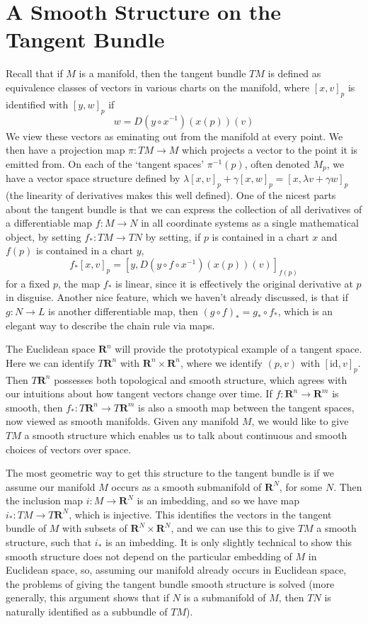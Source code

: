 \section{A Smooth Structure on the Tangent Bundle}

Recall that if $M$ is a manifold, then the tangent bundle $TM$ is defined as equivalence classes of vectors in various charts on the manifold, where $[x,v]_p$ is identified with $[y,w]_p$ if
%
\[ w = D(y \circ x^{-1})(x(p))(v) \]
%
We view these vectors as eminating out from the manifold at every point. We then have a projection map $\pi: TM \to M$ which projects a vector to the point it is emitted from. On each of the `tangent spaces' $\pi^{-1}(p)$, often denoted $M_p$, we have a vector space structure defined by $\lambda [x,v]_p + \gamma [x,w]_p = [x,\lambda v + \gamma w]_p$ (the linearity of derivatives makes this well defined). One of the nicest parts about the tangent bundle is that we can express the collection of all derivatives of a differentiable map $f: M \to N$ in all coordinate systems as a single mathematical object, by setting $f_*: TM \to TN$ by setting, if $p$ is contained in a chart $x$ and $f(p)$ is contained in a chart $y$,
%
\[ f_*[x,v]_p = \left[ y, D(y \circ f \circ x^{-1})(x(p))(v) \right]_{f(p)} \]
%
for a fixed $p$, the map $f_*$ is linear, since it is effectively the original derivative at $p$ in disguise. Another nice feature, which we haven't already discussed, is that if $g: N \to L$ is another differentiable map, then $(g \circ f)_* = g_* \circ f_*$, which is an elegant way to describe the chain rule via maps.

The Euclidean space $\mathbf{R}^n$ will provide the prototypical example of a tangent space. Here we can identify $T\mathbf{R}^n$ with $\mathbf{R}^n \times \mathbf{R}^n$, where we identify $(p,v)$ with $[\text{id}, v]_p$. Then $T\mathbf{R}^n$ possesses both topological and smooth structure, which agrees with our intuitions about how tangent vectors change over time. If $f: \mathbf{R}^n \to \mathbf{R}^m$ is smooth, then $f_*: T\mathbf{R}^n \to T\mathbf{R}^m$ is also a smooth map between the tangent spaces, now viewed as smooth manifolds. Given any manifold $M$, we would like to give $TM$ a smooth structure which enables us to talk about continuous and smooth choices of vectors over space.

The most geometric way to get this structure to the tangent bundle is if we assume our manifold $M$ occurs as a smooth submanifold of $\mathbf{R}^N$, for some $N$. Then the inclusion map $i: M \to \mathbf{R}^N$ is an imbedding, and so we have map $i_*: TM \to T\mathbf{R}^N$, which is injective. This identifies the vectors in the tangent bundle of $M$ with subsets of $\mathbf{R}^N \times \mathbf{R}^N$, and we can use this to give $TM$ a smooth structure, such that $i_*$ is an imbedding. It is only slightly technical to show this smooth structure does not depend on the particular embedding of $M$ in Euclidean space, so, assuming our manifold already occurs in Euclidean space, the problems of giving the tangent bundle smooth structure is solved (more generally, this argument shows that if $N$ is a submanifold of $M$, then $TN$ is naturally identified as a subbundle of $TM$).

